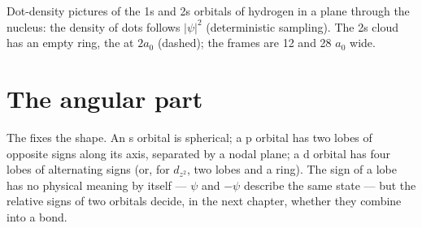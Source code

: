 \begin{omfigure}
\hspace{0.12\linewidth}%

{\small Dot-density pictures of the 1s and 2s orbitals of hydrogen in a plane
through the nucleus: the density of dots follows $|\psi|^2$ (deterministic
sampling). The 2s cloud has an empty ring, the  at $2a_0$ (dashed);
the frames are 12 and 28 $a_0$ wide.}
\end{omfigure}

\section{The angular part}

The  fixes the shape. An s orbital is spherical; a p orbital has two
lobes of opposite signs along its axis, separated by a nodal plane; a d orbital has
four lobes of alternating signs (or, for $d_{z^2}$, two lobes and a ring). The sign
of a lobe has no physical meaning by itself --- $\psi$ and $-\psi$ describe the same
state --- but the relative signs of two orbitals decide, in the next chapter,
whether they combine into a bond.

